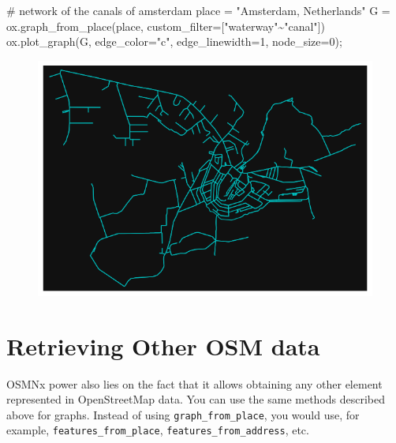 \documentclass[
  letterpaper,
  DIV=11,
  numbers=noendperiod]{scrreprt}
\newenvironment{Shaded}{\begin{snugshade}}{\end{snugshade}}
\newcommand{\CommentTok}[1]{\textcolor[rgb]{0.37,0.37,0.37}{#1}}
\newcommand{\DecValTok}[1]{\textcolor[rgb]{0.68,0.00,0.00}{#1}}
\newcommand{\NormalTok}[1]{\textcolor[rgb]{0.00,0.23,0.31}{#1}}
\newcommand{\OperatorTok}[1]{\textcolor[rgb]{0.37,0.37,0.37}{#1}}
\newcommand{\StringTok}[1]{\textcolor[rgb]{0.13,0.47,0.30}{#1}}
\begin{document}
\begin{Shaded}
\begin{Highlighting}[]
\CommentTok{\# network of the canals of amsterdam}
\NormalTok{place }\OperatorTok{=} \StringTok{"Amsterdam, Netherlands"}
\NormalTok{G }\OperatorTok{=}\NormalTok{ ox.graph\_from\_place(place, custom\_filter}\OperatorTok{=}\StringTok{\textquotesingle{}["waterway"\textasciitilde{}"canal"]\textquotesingle{}}\NormalTok{)}
\NormalTok{ox.plot\_graph(G, edge\_color}\OperatorTok{=}\StringTok{"c"}\NormalTok{, edge\_linewidth}\OperatorTok{=}\DecValTok{1}\NormalTok{, node\_size}\OperatorTok{=}\DecValTok{0}\NormalTok{)}\OperatorTok{;}
\end{Highlighting}
\end{Shaded}

\begin{figure}[H]

{\centering \includegraphics{labs/w07_OSM_files/figure-pdf/cell-42-output-1.png}

}

\end{figure}

\hypertarget{retrieving-other-osm-data}{%
\section{Retrieving Other OSM data}\label{retrieving-other-osm-data}}

OSMNx power also lies on the fact that it allows obtaining any other
element represented in OpenStreetMap data. You can use the same methods
described above for graphs. Instead of using
\texttt{graph\_from\_place}, you would use, for example,
\texttt{features\_from\_place}, \texttt{features\_from\_address}, etc.
\end{document}
